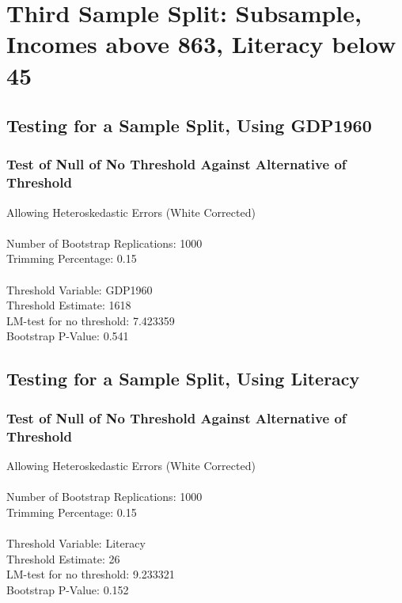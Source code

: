 \section{Third Sample Split: Subsample, Incomes above 863, Literacy below 45}

\subsection{Testing for a Sample Split, Using GDP1960} 
\subsubsection*{Test of Null of No Threshold Against Alternative of Threshold} 
Allowing Heteroskedastic Errors (White Corrected) \\\\
Number of Bootstrap Replications:  1000 \\
Trimming Percentage:               0.15 \\\\
Threshold Variable:                 GDP1960 \\
Threshold Estimate:                1618 \\
LM-test for no threshold:          7.423359 \\
Bootstrap P-Value:                 0.541 \\

\subsection{Testing for a Sample Split, Using Literacy} 
\subsubsection*{Test of Null of No Threshold Against Alternative of Threshold} 
Allowing Heteroskedastic Errors (White Corrected) \\\\
Number of Bootstrap Replications:  1000 \\
Trimming Percentage:               0.15 \\\\
Threshold Variable:                 Literacy \\
Threshold Estimate:                26 \\
LM-test for no threshold:          9.233321 \\
Bootstrap P-Value:                 0.152 \\

